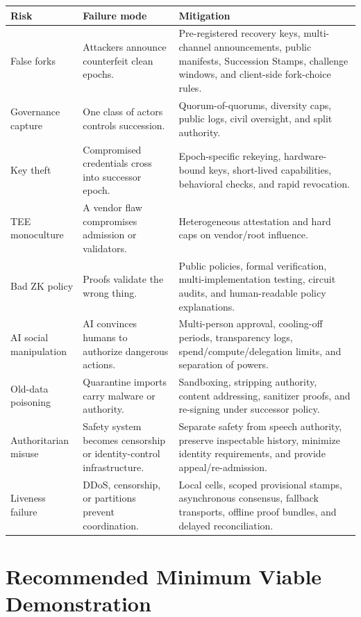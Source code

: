 \documentclass[11pt,letterpaper]{article}
\begin{document}
\begin{longtable}{p{}p{}p{}}
\toprule
\textbf{Risk} & \textbf{Failure mode} & \textbf{Mitigation} \\
\midrule
False forks & Attackers announce counterfeit clean epochs. & Pre-registered recovery keys, multi-channel announcements, public manifests, Succession Stamps, challenge windows, and client-side fork-choice rules. \\
\addlinespace
Governance capture & One class of actors controls succession. & Quorum-of-quorums, diversity caps, public logs, civil oversight, and split authority. \\
\addlinespace
Key theft & Compromised credentials cross into successor epoch. & Epoch-specific rekeying, hardware-bound keys, short-lived capabilities, behavioral checks, and rapid revocation. \\
\addlinespace
TEE monoculture & A vendor flaw compromises admission or validators. & Heterogeneous attestation and hard caps on vendor/root influence. \\
\addlinespace
Bad ZK policy & Proofs validate the wrong thing. & Public policies, formal verification, multi-implementation testing, circuit audits, and human-readable policy explanations. \\
\addlinespace
AI social manipulation & AI convinces humans to authorize dangerous actions. & Multi-person approval, cooling-off periods, transparency logs, spend/compute/delegation limits, and separation of powers. \\
\addlinespace
Old-data poisoning & Quarantine imports carry malware or authority. & Sandboxing, stripping authority, content addressing, sanitizer proofs, and re-signing under successor policy. \\
\addlinespace
Authoritarian misuse & Safety system becomes censorship or identity-control infrastructure. & Separate safety from speech authority, preserve inspectable history, minimize identity requirements, and provide appeal/re-admission. \\
\addlinespace
Liveness failure & DDoS, censorship, or partitions prevent coordination. & Local cells, scoped provisional stamps, asynchronous consensus, fallback transports, offline proof bundles, and delayed reconciliation. \\
\bottomrule
\end{longtable}

\section{Recommended Minimum Viable Demonstration}
\end{document}
